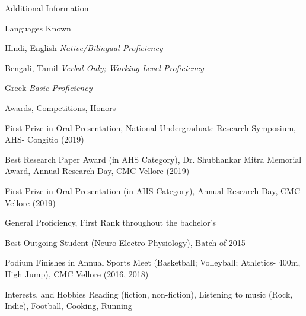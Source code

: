 \documentclass{resume} %
\begin{document}
\begin{rSection}{Additional Information} 
 
\begin{rSubsection}{Languages Known}{}{}{}
 \item Hindi, English \hfill {\em Native/Bilingual Proficiency}
 \item Bengali, Tamil \hfill {\em Verbal Only; Working Level Proficiency}
 \item Greek \hfill {\em Basic Proficiency}
\end{rSubsection}

\begin{rSubsection}{Awards, Competitions, Honors}{}{}
 \item First Prize in Oral Presentation, National Undergraduate Research Symposium, AHS- Congitio (2019)
 
 \newline\item Best Research Paper Award (in AHS Category), Dr. Shubhankar Mitra Memorial Award, Annual Research Day, CMC Vellore (2019)
 \newline\item First Prize in Oral Presentation (in AHS Category), Annual Research Day, CMC Vellore (2019)
 
 \newline\item General Proficiency, First Rank throughout the bachelor's
 \newline\item Best Outgoing Student (Neuro-Electro Physiology), Batch of 2015 
 \newline\item Podium Finishes in Annual Sports Meet (Basketball; Volleyball; Athletics- 400m, High Jump), CMC Vellore (2016, 2018)
\end{rSubsection}

\begin{rSubsection}{Interests, and Hobbies}{}{}{}
Reading (fiction, non-fiction), Listening to music (Rock, Indie), Football, Cooking, Running
\end{rSubsection}

\end{rSection}
\end{document}
